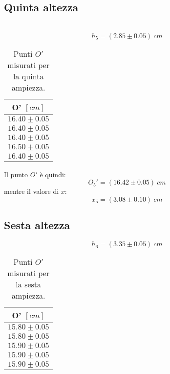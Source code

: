 \subsection{Quinta altezza}\\
\begin{equation}
	h_5=(2.85\pm0.05)\ cm
\end{equation}

\begin{table}[H]
	\centering
	\begin{tabular}{|c|}
		\hline
		\textbf{O' $[cm]$} \\
		\hline
		$16.40\pm 0.05$ \\
		$16.40\pm 0.05$ \\
		$16.40\pm 0.05$ \\
		$16.50\pm 0.05$ \\
		$16.40\pm 0.05$ \\
		\hline
	\end{tabular}
	\caption{Punti $O'$ misurati per la quinta ampiezza.}
	\label{tab:}
\end{table}

Il punto $O'$ è quindi:
\begin{equation}
	O_5'=(16.42\pm0.05)\ cm
\end{equation}
mentre il valore di $x$:
\begin{equation}
	x_5=(3.08\pm 0.10)\ cm
\end{equation}

\subsection{Sesta altezza}
\begin{equation}
	h_6=(3.35\pm0.05)\ cm
\end{equation}

\begin{table}[H]
	\centering
	\begin{tabular}{|c|}
		\hline
		\textbf{O' $[cm]$} \\
		\hline
		$15.80\pm 0.05$ \\
		$15.80\pm 0.05$ \\
		$15.90\pm 0.05$ \\
		$15.90\pm 0.05$ \\
		$15.90\pm 0.05$ \\
		\hline
	\end{tabular}
	\caption{Punti $O'$ misurati per la sesta ampiezza.}
	\label{tab:}
\end{table}

